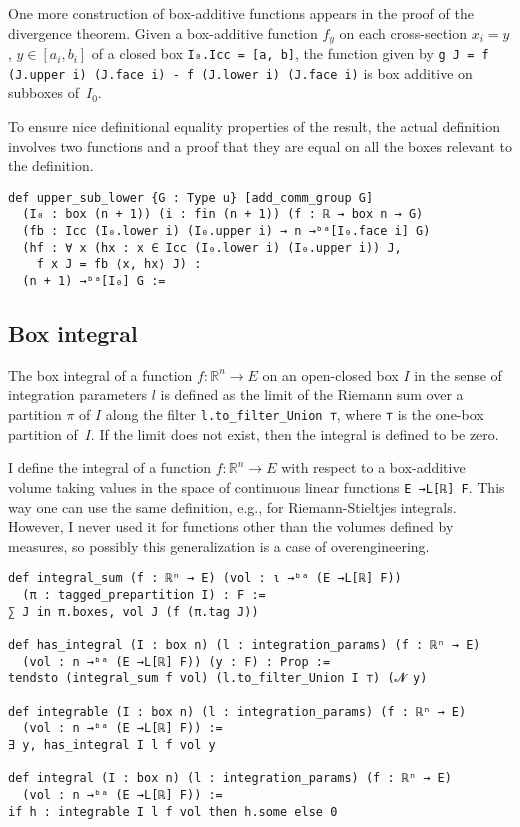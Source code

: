 \documentclass[a4paper, UKenglish,cleveref, autoref, thm-restate]{lipics-v2021}
\newcommand{\bbR}{\mathbb{R}}
\begin{document}
One more construction of box-additive functions appears in the proof
of the divergence theorem. Given a box-additive function \(f_{y}\) on
each cross-section \(x_{i}=y\), \(y \in [a_{i}, b_{i}]\) of a closed
box \lstinline~I₀.Icc = [a, b]~, the function given by
\lstinline~g J = f (J.upper i) (J.face i) - f (J.lower i) (J.face i)~
is box additive on subboxes of~\(I_{0}\).

To ensure nice definitional equality properties of the result, the
actual definition involves two functions and a proof that they are
equal on all the boxes relevant to the definition.

\begin{lstlisting}
def upper_sub_lower {G : Type u} [add_comm_group G]
  (I₀ : box (n + 1)) (i : fin (n + 1)) (f : ℝ → box n → G)
  (fb : Icc (I₀.lower i) (I₀.upper i) → n →ᵇᵃ[I₀.face i] G)
  (hf : ∀ x (hx : x ∈ Icc (I₀.lower i) (I₀.upper i)) J,
    f x J = fb ⟨x, hx⟩ J) :
  (n + 1) →ᵇᵃ[I₀] G :=
\end{lstlisting}

\subsection{Box integral}%
\label{sec:box-integral}

The box integral of a function \(f\colon\bbR^{n}\to E\) on an
open-closed box \(I\) in the sense of integration parameters \(l\) is
defined as the limit of the Riemann sum over a partition \(\pi\) of
\(I\) along the filter \lstinline=l.to_filter_Union ⊤=, where
\lstinline=⊤= is the one-box partition of~\(I\). If the limit does not
exist, then the integral is defined to be zero.

I define the integral of a function \(f\colon \bbR^{n}\to E\) with
respect to a box-additive volume taking values in the space of
continuous linear functions \lstinline=E →L[ℝ] F=. This way one can
use the same definition, e.g., for Riemann-Stieltjes
integrals. However, I never used it for functions other than the
volumes defined by measures, so possibly this generalization is a case
of overengineering.

\begin{lstlisting}[caption={Definition of box-style integrals}]
def integral_sum (f : ℝⁿ → E) (vol : ι →ᵇᵃ (E →L[ℝ] F))
  (π : tagged_prepartition I) : F :=
∑ J in π.boxes, vol J (f (π.tag J))

def has_integral (I : box n) (l : integration_params) (f : ℝⁿ → E)
  (vol : n →ᵇᵃ (E →L[ℝ] F)) (y : F) : Prop :=
tendsto (integral_sum f vol) (l.to_filter_Union I ⊤) (𝓝 y)

def integrable (I : box n) (l : integration_params) (f : ℝⁿ → E)
  (vol : n →ᵇᵃ (E →L[ℝ] F)) :=
∃ y, has_integral I l f vol y

def integral (I : box n) (l : integration_params) (f : ℝⁿ → E)
  (vol : n →ᵇᵃ (E →L[ℝ] F)) :=
if h : integrable I l f vol then h.some else 0
\end{lstlisting}
\end{document}
